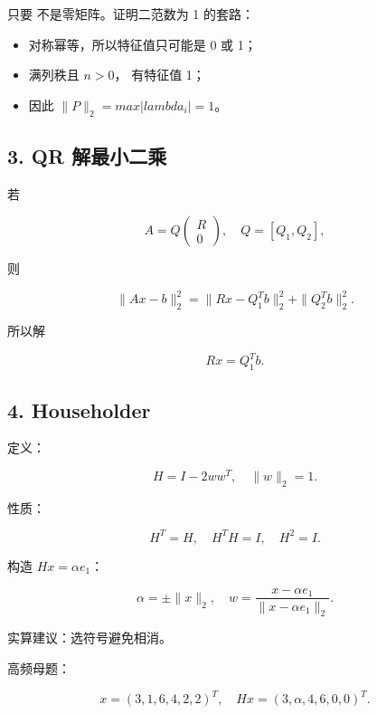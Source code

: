 \documentclass[11pt,a4paper]{ctexart}
\newcommand{\code}[1]{\begingroup\ttfamily\small #1\endgroup}
\begin{document}
只要 \code{} 不是零矩阵。证明二范数为 1 的套路：

\begin{itemize}

\item \code{} 对称幂等，所以特征值只可能是 0 或 1；

\item \code{} 满列秩且 $n>0$，\code{} 有特征值 1；

\item 因此 $\|P\|_2=max |lambda_i|=1$。

\end{itemize}


\subsection*{3. QR 解最小二乘}


若

\[
A=Q\begin{pmatrix}R\\0\end{pmatrix},\quad Q=[Q_1,Q_2],
\]

则

\[
\|Ax-b\|_2^2
=\|Rx-Q_1^Tb\|_2^2+\|Q_2^Tb\|_2^2.
\]

所以解

\[
Rx=Q_1^Tb.
\]


\subsection*{4. Householder}


定义：

\[
H=I-2ww^T,\quad \|w\|_2=1.
\]

性质：

\[
H^T=H,\quad H^TH=I,\quad H^2=I.
\]

构造 $Hx=\alpha e_1$：

\[
\alpha=\pm \|x\|_2,\quad
w=\frac{x-\alpha e_1}{\|x-\alpha e_1\|_2}.
\]

实算建议：选符号避免相消。

高频母题：

\[
x=(3,1,6,4,2,2)^T,\quad Hx=(3,\alpha,4,6,0,0)^T.
\]
\end{document}
